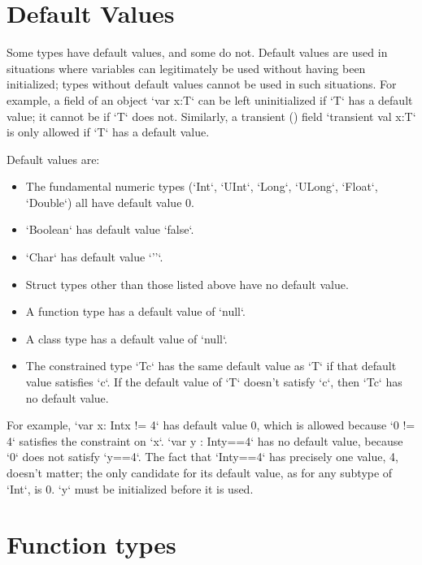 \section{Default Values}
\label{DefaultValues}

Some types have default values, and some do not. Default values are used in
situations where variables can legitimately be used without having been
initialized; types without default values cannot be used in such situations.
For example, a field of an object \xcd`var x:T` can be left uninitialized if
\xcd`T` has a default value; it cannot be if \xcd`T` does not. Similarly, a
transient () field \xcd`transient val x:T` is only
allowed if \xcd`T` has a default value.

Default values are: 
\begin{itemize}
\item The fundamental numeric types (\xcd`Int`, \xcd`UInt`,
      \xcd`Long`, \xcd`ULong`, 
      \xcd`Float`, \xcd`Double`) all have default value 0.
\item \xcd`Boolean` has default value \xcd`false`.
\item \xcd`Char` has default value \xcd`'\0'`.
\item Struct types other than those listed above have no default value.
\item A function type has a default value of \xcd`null`.
\item A class type has a default value of \xcd`null`.
\item The constrained type \xcd`T{c}` has the same default value as \xcd`T` if
      that default value satisfies \xcd`c`.  If the default value of \xcd`T`
      doesn't satisfy \xcd`c`, then \xcd`T{c}` has no default value.
\end{itemize}

For example, \xcd`var x: Int{x != 4}` has default value 0, which is allowed
because \xcd`0 != 4` satisfies the constraint on \xcd`x`. 
\xcd`var y : Int{y==4}` has no default value, because \xcd`0` does not satisfy \xcd`y==4`.
The fact that \xcd`Int{y==4}` has precisely one value, \viz{} 4, doesn't
matter; the only candidate for its default value, as for any subtype of
\xcd`Int`, is 0. \xcd`y` must be initialized before it is used.

\section{Function types}
\label{FunctionTypes}
\label{FunctionType}


